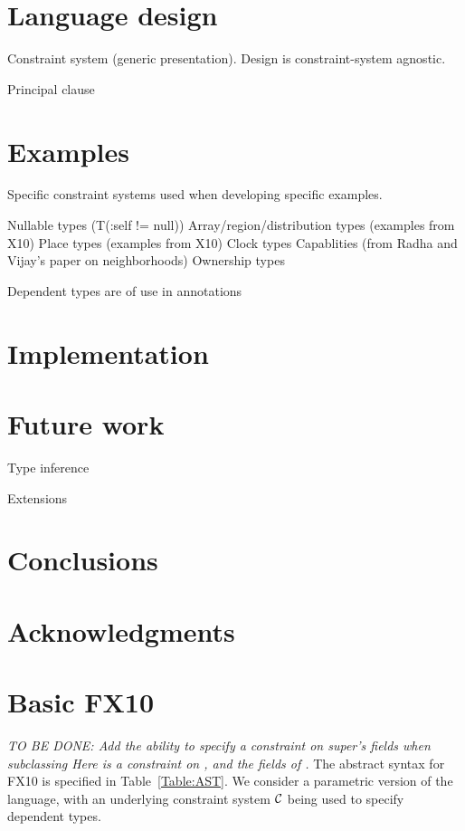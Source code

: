\documentclass[nocopyrightspace,preprint,10pt]{sigplanconf}
\newcommand\FXten{{\sf FX10}}
\begin{document}
\section{Language design}

Constraint system (generic presentation).
Design is constraint-system agnostic.

Principal clause

\section{Examples}

Specific constraint systems used when developing specific
examples.

Nullable types (T(:self != null))
Array/region/distribution types (examples from X10)
Place types (examples from X10)
Clock types
Capablities (from Radha and Vijay's paper on neighborhoods)
Ownership types

Dependent types are of use in annotations

\section{Implementation}

\section{Future work}

Type inference

Extensions

\section{Conclusions}

\section{Acknowledgments}



\balance
\appendix
\onecolumn

\section{Basic \FXten}
{\em 
TO BE DONE: Add the ability to specify a constraint on super's fields
when subclassing
Here  is a constraint on , and the
fields of .
}
The abstract syntax for \FXten{} is specified in
Table~\ref{Table:AST}. We consider a parametric version of the
language, with an underlying constraint system $\cal C$ \cite{cccc} being used to
specify dependent types. 
\end{document}
